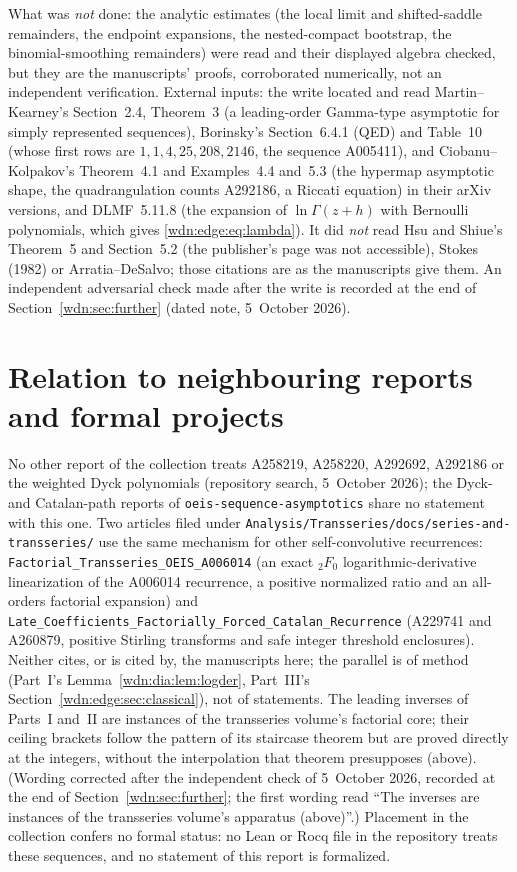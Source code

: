 \documentclass[11pt,letterpaper]{article}
\theoremstyle{remark}\newtheorem{remark}[theorem]{Remark}
\newcommand{\file}[1]{\nolinkurl{#1}}
\begin{document}
What was \emph{not} done: the analytic estimates (the local limit and shifted-saddle remainders, the endpoint expansions, the nested-compact bootstrap, the binomial-smoothing remainders) were read and their displayed algebra checked, but they are the manuscripts' proofs, corroborated numerically, not an independent verification. External inputs: the write located and read Martin--Kearney's Section~2.4, Theorem~3 (a leading-order Gamma-type asymptotic for simply represented sequences), Borinsky's Section~6.4.1 (QED) and Table~10 (whose first rows are $1,1,4,25,208,2146$, the sequence A005411), and Ciobanu--Kolpakov's Theorem~4.1 and Examples~4.4 and~5.3 (the hypermap asymptotic shape, the quadrangulation counts A292186, a Riccati equation) in their arXiv versions, and DLMF~5.11.8 (the expansion of $\ln\Gamma(z+h)$ with Bernoulli polynomials, which gives \eqref{wdn:edge:eq:lambda}). It did \emph{not} read Hsu and Shiue's Theorem~5 and Section~5.2 (the publisher's page was not accessible), Stokes (1982) or Arratia--DeSalvo; those citations are as the manuscripts give them. An independent adversarial check made after the write is recorded at the end of Section~\ref{wdn:sec:further} (dated note, 5~October 2026).

\section*{Relation to neighbouring reports and formal projects}\label{wdn:sec:neighbours}
No other report of the collection treats A258219, A258220, A292692, A292186 or the weighted Dyck polynomials (repository search, 5~October 2026); the Dyck- and Catalan-path reports of \file{oeis-sequence-asymptotics} share no statement with this one. Two articles filed under \file{Analysis/Transseries/docs/series-and-transseries/} use the same mechanism for other self-convolutive recurrences: \file{Factorial_Transseries_OEIS_A006014} (an exact ${}_2F_0$ logarithmic-derivative linearization of the A006014 recurrence, a positive normalized ratio and an all-orders factorial expansion) and \file{Late_Coefficients_Factorially_Forced_Catalan_Recurrence} (A229741 and A260879, positive Stirling transforms and safe integer threshold enclosures). Neither cites, or is cited by, the manuscripts here; the parallel is of method (Part~I's Lemma~\ref{wdn:dia:lem:logder}, Part~III's Section~\ref{wdn:edge:sec:classical}), not of statements. The leading inverses of Parts~I and~II are instances of the transseries volume's factorial core; their ceiling brackets follow the pattern of its staircase theorem but are proved directly at the integers, without the interpolation that theorem presupposes (above). \textup{(Wording corrected after the independent check of 5~October 2026, recorded at the end of Section~\ref{wdn:sec:further}; the first wording read ``The inverses are instances of the transseries volume's apparatus (above)''.)} Placement in the collection confers no formal status: no Lean or Rocq file in the repository treats these sequences, and no statement of this report is formalized.
\clearpage
\end{document}
